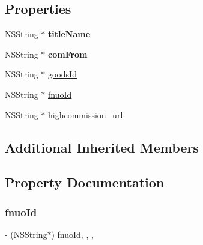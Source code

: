 \subsection*{Properties}
\begin{DoxyCompactItemize}
\item 
\mbox{\label{interface_a_l_b_b_details_view_controller_a1ebafb26d1a14ec80722556ed7e9cc5e}} 
N\+S\+String $\ast$ {\bfseries title\+Name}
\item 
\mbox{\label{interface_a_l_b_b_details_view_controller_aa0f58990be6ff67cc8edfde10f97ca14}} 
N\+S\+String $\ast$ {\bfseries com\+From}
\item 
N\+S\+String $\ast$ \mbox{\hyperlink{interface_a_l_b_b_details_view_controller_a90653df0dd5fb1da67493b4939c1d46a}{goods\+Id}}
\item 
N\+S\+String $\ast$ \mbox{\hyperlink{interface_a_l_b_b_details_view_controller_a6794f0fad908096c14e8027cf2a96c6b}{fnuo\+Id}}
\item 
N\+S\+String $\ast$ \mbox{\hyperlink{interface_a_l_b_b_details_view_controller_a7d24998c06d0e047449fd657f8ed4df3}{highcommission\+\_\+url}}
\end{DoxyCompactItemize}
\subsection*{Additional Inherited Members}


\subsection{Property Documentation}
\mbox{\label{interface_a_l_b_b_details_view_controller_a6794f0fad908096c14e8027cf2a96c6b}} 
\subsubsection{\texorpdfstring{fnuo\+Id}{fnuoId}}
{\footnotesize\ttfamily -\/ (N\+S\+String$\ast$) fnuo\+Id\hspace{0.3cm}{\ttfamily [read]}, {\ttfamily [write]}, {\ttfamily [nonatomic]}, {\ttfamily [strong]}}


